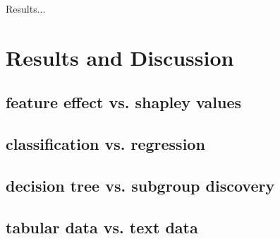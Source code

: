Results...

\section{Results and Discussion}

\subsection{feature effect vs. shapley values}

\subsection{classification vs. regression}

\subsection{decision tree vs. subgroup discovery}

\subsection{tabular data vs. text data} 


